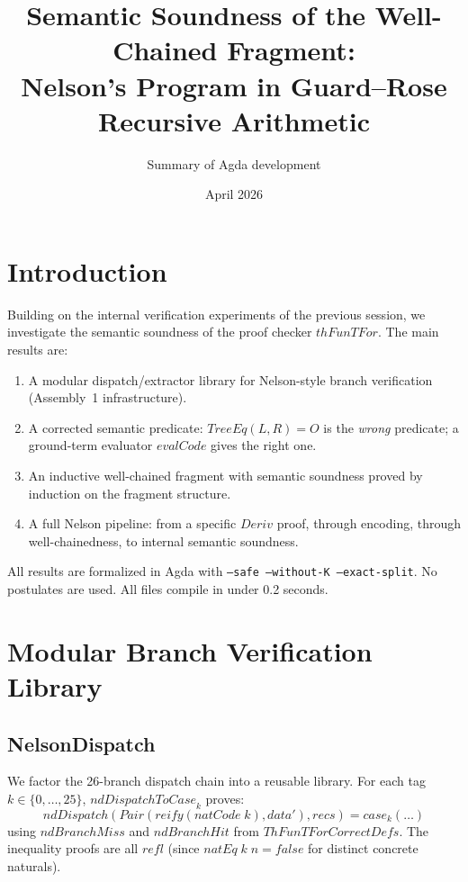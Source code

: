 \documentclass[11pt]{article}
\title{Semantic Soundness of the Well-Chained Fragment:\\
Nelson's Program in Guard--Rose Recursive Arithmetic}
\author{Summary of Agda development}
\date{April 2026}
\begin{document}
\maketitle

\section{Introduction}

Building on the internal verification experiments of the previous
session, we investigate the semantic soundness of the proof checker
$\mathit{thFunTFor}$. The main results are:

\begin{enumerate}
\item A modular dispatch/extractor library for Nelson-style branch
  verification (Assembly~1 infrastructure).
\item A corrected semantic predicate: $\mathit{TreeEq}(L,R)=O$ is the
  \emph{wrong} predicate; a ground-term evaluator $\mathit{evalCode}$
  gives the right one.
\item An inductive well-chained fragment with semantic soundness
  proved by induction on the fragment structure.
\item A full Nelson pipeline: from a specific $\mathit{Deriv}$ proof,
  through encoding, through well-chainedness, to internal semantic
  soundness.
\end{enumerate}

All results are formalized in Agda with \texttt{--safe --without-K
--exact-split}. No postulates are used. All files compile in under
0.2 seconds.

\section{Modular Branch Verification Library}

\subsection{NelsonDispatch}

We factor the 26-branch dispatch chain into a reusable library.
For each tag $k \in \{0,\ldots,25\}$, $\mathit{ndDispatchToCase}_k$
proves:
\[
  \mathit{ndDispatch}(\mathit{Pair}(\mathit{reify}(\mathit{natCode}\;k),
  \mathit{data}'), \mathit{recs})
  = \mathit{case}_k(\ldots)
\]
using $\mathit{ndBranchMiss}$ and $\mathit{ndBranchHit}$ from
$\mathit{ThFunTForCorrectDefs}$. The inequality proofs are all
$\mathit{refl}$ (since $\mathit{natEq}\;k\;n = \mathit{false}$ for
distinct concrete naturals).
\end{document}
